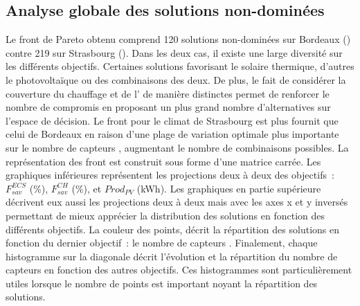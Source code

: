 \subsection{Analyse globale des solutions non-dominées} %
\label{sub:analyse_globale_des_solutions_non_dominees}
Le front de Pareto obtenu comprend \num{120} solutions non-dominées sur Bordeaux
() contre \num{219} sur Strasbourg
(). Dans les deux cas, il existe une large diversité
sur les différents objectifs. Certaines solutions favorisant le solaire thermique,
d’autres le photovoltaïque ou des combinaisons des deux. De plus, le fait de considérer
la couverture du chauffage et de l’ de manière distinctes permet de renforcer le
nombre de compromis en proposant un plus grand nombre d’alternatives sur l’espace de décision.
Le front pour le climat de Strasbourg est plus fournit que celui de Bordeaux en raison d’une plage de variation
optimale plus importante sur le nombre de capteurs , augmentant le nombre de
combinaisons possibles.
La représentation des front est construit sous forme d’une matrice carrée.
Les graphiques inférieures représentent les projections deux à deux des objectifs~:
$F_{sav}^{ECS}$ (\si{\percent}), $F_{sav}^{CH}$ (\si{\percent}), et $Prod_{PV}$ (\si{kWh}).
Les graphiques en partie supérieure décrivent eux aussi les projections deux à deux mais
avec les axes x et y inversés permettant de mieux
apprécier la distribution des solutions en fonction des différents objectifs. La couleur des points,
décrit la répartition des solutions en fonction du dernier objectif~: le nombre de capteurs .
Finalement, chaque histogramme sur la diagonale décrit l’évolution et la répartition du
nombre de capteurs  en fonction des autres objectifs. Ces histogrammes sont
particulièrement utiles lorsque le nombre de points est important noyant la répartition
des solutions.

